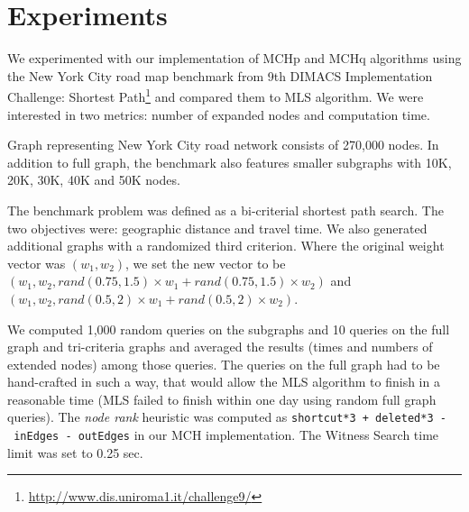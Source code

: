 

\section{Experiments}
\label{secExperiments}

We experimented with our implementation of MCHp and MCHq algorithms using the New York City road map benchmark from 9th DIMACS Implementation Challenge: Shortest Path\footnote{
\url{http://www.dis.uniroma1.it/challenge9/}} and compared them to MLS algorithm. We were interested in two metrics: number of expanded nodes and computation time.

Graph representing New York City road network consists of 270,000 nodes. In addition to full graph, the benchmark also features smaller subgraphs with 10K, 20K, 30K, 40K and 50K nodes. 

The benchmark problem was defined as a bi-criterial shortest path search. The two objectives were: geographic distance and travel time. 
We also generated additional graphs with a randomized third criterion. Where the original weight vector was $(w_1,w_2)$, we set the new vector to be $(w_1,w_2,rand(0.75,1.5) \times w_1 + rand(0.75,1.5) \times w_2)$ and $(w_1,w_2,rand(0.5,2) \times w_1 + rand(0.5,2) \times w_2)$. 


We computed 1,000 random queries on the subgraphs and 10 queries on the full graph and tri-criteria graphs and averaged the results (times and numbers of extended nodes) among those queries. 
The queries on the full graph had to be hand-crafted in such a way, that would allow the MLS algorithm to finish in a reasonable time (MLS failed to finish within one day using random full graph queries).   
The {\em node rank} heuristic was computed as {\tt shortcut*3 + deleted*3 -~inEdges -~outEdges} in our MCH implementation. The Witness Search time limit was set to 0.25 sec. 


